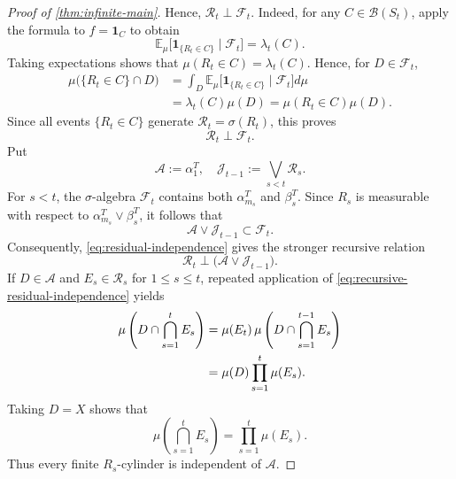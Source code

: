 \documentclass[10pt,a4paper]{amsart}
\newcommand{\cB}{\mathcal B}
\newcommand{\cF}{\mathcal F}
\newcommand{\cR}{\mathcal R}
\numberwithin{equation}{section}
\begin{document}
\begin{proof}[Proof of \cref{thm:infinite-main}]
		Hence, $\cR_t\perp\cF_t$. Indeed, for any $C\in\cB(S_t)$, apply the formula to $f=\mathbf 1_C$ to obtain
		\[
		\mathbb E_\mu\bigl[
		\mathbf 1_{\{R_t\in C\}}\mid\cF_t
		\bigr]
		=
		\lambda_t(C).
		\]
		Taking expectations shows that $\mu(R_t\in C)=\lambda_t(C)$.  Hence, for
		$D\in\cF_t$,
		\[
		\begin{aligned}
			\mu\bigl(\{R_t\in C\}\cap D\bigr)
			&=
			\int_D\mathbb E_\mu\bigl[
			\mathbf 1_{\{R_t\in C\}}\mid\cF_t
			\bigr]d\mu\\
			&=
			\lambda_t(C)\mu(D)
			=
			\mu(R_t\in C)\mu(D).
		\end{aligned}
		\]
		Since all events $\{R_t\in C\}$ generate $\cR_t=\sigma(R_t)$, this proves
		\begin{equation}
			\cR_t\perp\cF_t.
			\label{eq:residual-independence}
		\end{equation}
	    Put
		\[
		\mathcal A:=\alpha_1^T,
		\quad
		\mathcal J_{t-1}:=\bigvee_{s<t}\mathcal R_s.
		\]
		For $s<t$, the $\sigma$-algebra $\cF_t$ contains both
		$\alpha_{m_s}^T$ and $\beta_s^T$.  Since $R_s$ is measurable with respect
		to $\alpha_{m_s}^T\vee\beta_s^T$, it follows that
		\[
		\mathcal A\vee\mathcal J_{t-1}
		\subset\mathcal F_t.
		\]
		Consequently, \eqref{eq:residual-independence} gives the stronger recursive
		relation
		\begin{equation}
			\mathcal R_t
			\perp
			\bigl(\mathcal A\vee\mathcal J_{t-1}\bigr).
			\label{eq:recursive-residual-independence}
		\end{equation}
		If $D\in\mathcal A$ and $E_s\in\mathcal R_s$ for $1\leq s\leq t$,
		repeated application of \eqref{eq:recursive-residual-independence} yields
		\begin{align}
			\mu\left(D\cap\bigcap_{s=1}^tE_s\right)
			&=
			\mu(E_t)\,
			\mu\left(D\cap\bigcap_{s=1}^{t-1}E_s\right)\notag\\
			&=
			\mu(D)\prod_{s=1}^t\mu(E_s).
			\label{eq:finite-residual-cylinder}
		\end{align}
		Taking $D=X$ shows that
		\[
		\mu\left(\bigcap_{s=1}^tE_s\right)
		=
		\prod_{s=1}^t\mu(E_s).
		\]
		Thus every finite $R_s$-cylinder is independent of $\mathcal A$.
		

\end{proof}
\end{document}
